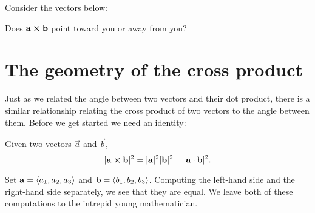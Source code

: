 \documentclass{ximera}
\begin{document}
\begin{question}
  Consider the vectors below:
  \begin{image}
  \end{image}
  Does $\mathbf{a}\boldsymbol\times\mathbf{b}$ point toward you or away from you?
  \begin{prompt}
    \begin{multipleChoice}
    \end{multipleChoice}
  \end{prompt}
\end{question}



\section{The geometry of the cross product}

Just as we related the angle between two vectors and their dot
product, there is a similar relationship relating the cross product of
two vectors to the angle between them. Before we get started we need
an identity:

\begin{theorem}
  Given two vectors $\vec{a}$ and $\vec{b}$,
  \[
  |\mathbf{a}\boldsymbol\times\mathbf{b}|^2 = |\mathbf{a}|^2 |\mathbf{b}|^2 - |\mathbf{a}\cdot\mathbf{b}|^2.
  \]
  \begin{explanation}
    Set $\mathbf{a}=\left\langle a_1,a_2,a_3\right\rangle$ and
    $\mathbf{b}=\left\langle b_1,b_2,b_3\right\rangle$. Computing the left-hand side and
    the right-hand side separately, we see that they are equal. We
    leave both of these computations to the intrepid young
    mathematician.
  \end{explanation}
\end{theorem}
\end{document}
